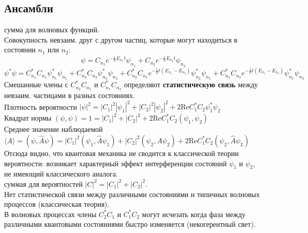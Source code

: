 \subsection*{Ансамбли}
 сумма для волновых функций.\\
Совокупность невзаим. друг с другом частиц, которые могут находиться в состоянии $n_1$ или $n_2$:
$$
\psi = C_{n_1}e^{-\frac{i}{\hbar}E_{n_1} t}\psi_{n_1} + C_{n_2}e^{-\frac{i}{\hbar}E_{n_2} t}\psi_{n_2}
$$ 
$$
\psi^{*}\psi = C_{n_1}^{*}C_{n_1}\psi^{*}_{n_1}\psi_{n_1} + C_{n_2}^{*}C_{n_2}\psi^{*}_{n_2}\psi_{n_2} + C_{n_2}^{*}C_{n_1}e^{-\frac{i}{\hbar}t(E_{n_1} - E_{n_2})}\psi_{n_2}^{*}\psi_{n_1} + C_{n_1}^{*}C_{n_2}e^{-\frac{i}{\hbar}t(E_{n_1} - E_{n_2})}\psi_{n_1}^{*}\psi_{n_2}
$$
Смешанные члены с $C_{n_2}^{*}C_{n_1}$ и $C_{n_1}^{*}C_{n_2}$ определяют {\bf статистическую связь} между невзаим. частицами в разных состояниях.\\
Плотность вероятности $|\psi|^2 = |C_1|^2|\psi_1|^2 + |C_2|^2|\psi_2|^2 + 2\text{Re} C_1^{*}C_2\psi^{*}_1\psi_2$\\
Квадрат нормы $(\psi,\psi) = 1 = |C_1|^2 + |C_2|^2 + 2\text{Re} C_1^{*}C_2(\psi_1,\psi_2)$\\
Среднее значение наблюдаемой $\langle A\rangle = (\psi, \hat{A}\psi) = |C_1|^2(\psi_1,\hat{A}\psi_1) + |C_2|^2(\psi_2,\hat{A}\psi_2) + 2\text{Re} C_1^{*}C_2(\psi_2,\hat{A}\psi_2)$\\
Отсюда видно, что квантовая механика не сводится к классической теории вероятности: возникает характерный эффект интерференции состояний $\psi_1$ и $\psi_2$, не имеющий классического аналога.\\

 суммая для вероятностей $|C|^2 = |C_1|^2 + |C_2|^2$.\\
Нет статистической связи между различными состояниями и типичных волновых процессов (классическая теория).\\
В волновых процессах члены $C_2^{*}C_1$ и $C_1^{*}C_2$ могут исчезать когда фаза между различными квантовыми состояниями быстро изменяется (некогерентный свет).

